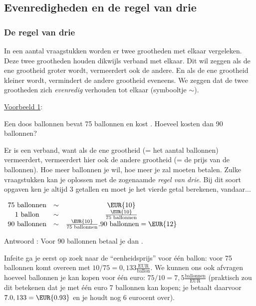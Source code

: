 \subsection{Evenredigheden en de regel van drie}


\subsubsection{De regel van drie}

In een aantal vraagstukken worden er twee grootheden met elkaar vergeleken.
Deze twee grootheden houden dikwijls verband met elkaar. Dit wil zeggen
als de ene grootheid groter wordt, vermeerdert ook de andere. En als
de ene grootheid kleiner wordt, vermindert de andere grootheid eveneens.
We zeggen dat de twee grootheden zich \emph{evenredig} verhouden tot
elkaar (symbooltje $\sim$).\medskip{}


\uline{Voorbeeld 1}: 

Een doos ballonnen bevat 75 ballonnen en kost . Hoeveel kosten
dan 90 ballonnen?

Er is een verband, want als de ene grootheid (= het aantal ballonnen)
vermeerdert, vermeerdert hier ook de andere grootheid (= de prijs
van de ballonnen). Hoe meer ballonnen je wil, hoe meer je zal moeten
betalen. Zulke vraagstukken kan je oplossen met de zogenaamde \emph{regel
van drie}. Bij dit soort opgaven ken je altijd 3 getallen en moet
je het vierde getal berekenen, vandaar...

\medskip{}

$\begin{array}{ccc}
75 ~\text{ballonnen} & \sim & \text{\EUR{10}} \\
1 ~\text{ballon} & \sim & \frac{\text{\EUR{10}}}{75 \text{ ballonnen}} \\ 
90 ~\text{ballonnen} & \sim & \frac{\text{\EUR{10}}}{75 \text{ ballonnen}}.90 \text{ ballonnen} = \text{\EUR{12}}\\ 
\end{array}$

Antwoord : Voor 90 ballonnen betaal je dan .

Infeite ga je eerst op zoek naar de ``eenheidsprijs'' voor \'e\'en ballon:
 voor 75 ballonnen komt overeen met $10/75=0,133\frac{\text{EUR}}{\text{ballon}}$.
We kunnen ons ook afvragen hoeveel ballonnen je kan kopen voor \'e\'en
euro: $75/10=7,5\frac{\text{ballonnen}}{\text{EUR}}$ (praktisch zou dit betekenen dat je met \'e\'en euro 7 ballonnen kan kopen; je betaalt daarvoor $7.0,133=\text{\EUR{0.93}}$
en je houdt nog 6 eurocent over). \bigskip{}


